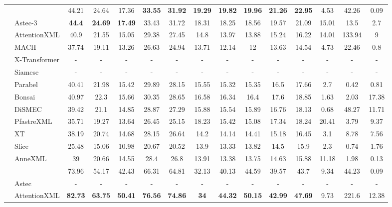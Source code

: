 \begin{table*}
{\begin{tabular}{@{}c|l|ccccc|ccccc|ccc@{}}
	\multirow{11}{*}{\textbf{\rotatebox{90}{LF-WikiTitles-500K}}}	& \alg	 & 44.21	 & 24.64	 & 17.36	 & \textbf{33.55}	 & \textbf{31.92}	 & \textbf{19.29}	 & \textbf{19.82}	 & \textbf{19.96}	 & \textbf{21.26}	 & \textbf{22.95}	 & 4.53	 & 42.26	 & 0.09\\
	& Astec-3	 & \textbf{44.4}	 & \textbf{24.69}	 & \textbf{17.49}	 & 33.43	 & 31.72	 & 18.31	 & 18.25	 & 18.56	 & 19.57	 & 21.09	 & 15.01	 & 13.5	 & 2.7\\
	& AttentionXML	 & 40.9	 & 21.55	 & 15.05	 & 29.38	 & 27.45	 & 14.8	 & 13.97	 & 13.88	 & 15.24	 & 16.22	 & 14.01	 & 133.94	 & 9\\
	& MACH	 & 37.74	 & 19.11	 & 13.26	 & 26.63	 & 24.94	 & 13.71	 & 12.14	 & 12	 & 13.63	 & 14.54	 & 4.73	 & 22.46	 & 0.8\\
	& X-Transformer	 & -	 & -	 & -	 & -	 & -	 & -	 & -	 & -	 & -	 & -	 & -	 & -	 & -\\
	& Siamese	 & -	 & -	 & -	 & -	 & -	 & -	 & -	 & -	 & -	 & -	 & -	 & -	 & -\\
	& Parabel	 & 40.41	 & 21.98	 & 15.42	 & 29.89	 & 28.15	 & 15.55	 & 15.32	 & 15.35	 & 16.5	 & 17.66	 & 2.7	 & 0.42	 & 0.81\\
	& Bonsai	 & 40.97	 & 22.3	 & 15.66	 & 30.35	 & 28.65	 & 16.58	 & 16.34	 & 16.4	 & 17.6	 & 18.85	 & 1.63	 & 2.03	 & 17.38\\
	& DiSMEC	 & 39.42	 & 21.1	 & 14.85	 & 28.87	 & 27.29	 & 15.88	 & 15.54	 & 15.89	 & 16.76	 & 18.13	 & 0.68	 & 48.27	 & 11.71\\
	& PfastreXML	 & 35.71	 & 19.27	 & 13.64	 & 26.45	 & 25.15	 & 18.23	 & 15.42	 & 15.08	 & 17.34	 & 18.24	 & 20.41	 & 3.79	 & 9.37\\
	& XT	 & 38.19	 & 20.74	 & 14.68	 & 28.15	 & 26.64	 & 14.2	 & 14.14	 & 14.41	 & 15.18	 & 16.45	 & 3.1	 & 8.78	 & 7.56\\
	& Slice	 & 25.48	 & 15.06	 & 10.98	 & 20.67	 & 20.52	 & 13.9	 & 13.33	 & 13.82	 & 14.5	 & 15.9	 & 2.3	 & 0.74	 & 1.76\\
	& AnneXML	 & 39	 & 20.66	 & 14.55	 & 28.4	 & 26.8	 & 13.91	 & 13.38	 & 13.75	 & 14.63	 & 15.88	 & 11.18	 & 1.98	 & 0.13\\
	\midrule
	\multirow{11}{*}{\textbf{\rotatebox{90}{LF-Wikipedia-500K}}}	& \alg	 & 73.96	 & 54.17	 & 42.43	 & 66.31	 & 64.81	 & 32.13	 & 40.13	 & 44.59	 & 39.57	 & 43.7	 & 9.34	 & 44.23	 & 0.09\\
	& Astec	 & -	 & -	 & -	 & -	 & -	 & -	 & -	 & -	 & -	 & -	 & -	 & -	 & -\\
	& AttentionXML	 & \textbf{82.73}	 & \textbf{63.75}	 & \textbf{50.41}	 & \textbf{76.56}	 & \textbf{74.86}	 & \textbf{34}	 & \textbf{44.32}	 & \textbf{50.15}	 & \textbf{42.99}	 & \textbf{47.69}	 & 9.73	 & 221.6	 & 12.38\\

\end{tabular}}
\end{table*}
